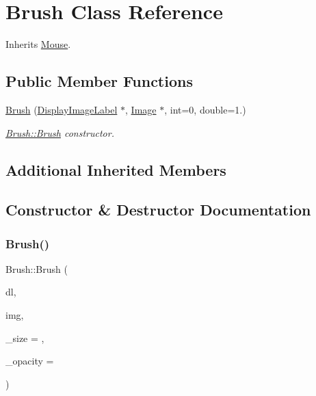 \hypertarget{class_brush}{}\section{Brush Class Reference}
\label{class_brush}


Inherits \mbox{\hyperlink{class_mouse}{Mouse}}.

\subsection*{Public Member Functions}
\begin{DoxyCompactItemize}
\item 
\mbox{\hyperlink{class_brush_a00dbded538fb2c2bbedb35b82799ca81}{Brush}} (\mbox{\hyperlink{class_display_image_label}{Display\+Image\+Label}} $\ast$, \mbox{\hyperlink{class_image}{Image}} $\ast$, int=0, double=1.)
\begin{DoxyCompactList}\small\item\em \mbox{\hyperlink{class_brush_a00dbded538fb2c2bbedb35b82799ca81}{Brush\+::\+Brush}} constructor. \end{DoxyCompactList}\end{DoxyCompactItemize}
\subsection*{Additional Inherited Members}


\subsection{Constructor \& Destructor Documentation}
\mbox{\label{class_brush_a00dbded538fb2c2bbedb35b82799ca81}} 
\subsubsection{\texorpdfstring{Brush()}{Brush()}}
{\footnotesize\ttfamily Brush\+::\+Brush (\begin{DoxyParamCaption}\item[{\mbox{\hyperlink{class_display_image_label}{Display\+Image\+Label}} $\ast$}]{dl,  }\item[{\mbox{\hyperlink{class_image}{Image}} $\ast$}]{img,  }\item[{int}]{\+\_\+size = {},  }\item[{double}]{\+\_\+opacity = {} }\end{DoxyParamCaption})}



